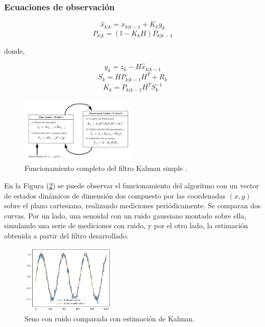 \subsubsection{Ecuaciones de observación}

\begin{equation}
\hat{x}_{k|k} = \hat{x}_{k|k-1} + K_k y_k
\end{equation}
\begin{equation}
P_{k|k} = (\mathbb{I}-K_kH)P_{k|k-1}
\end{equation}

donde,

\begin{equation}
y_k = z_k - H\hat{x}_{k|k-1}
\end{equation}
\begin{equation}
S_k = HP_{k|k-1}H^T + R_k
\end{equation}
\begin{equation}
K_k = P_{k|k-1}H^TS_k^{-1}
\end{equation}

\begin{figure}[H]
		\centering
		\includegraphics[width=0.5\textwidth]{Imagenes/kalman1.png}
		\caption{Funcionamiento completo del filtro Kalman simple \cite{ref:kalman2}.}
		\label{fig:kalman1}
\end{figure}



 En la Figura (\ref{fig:kalman-comp}) se puede observar el funcionamiento del algoritmo con un vector de estados dinámicos de dimensión dos compuesto por las coordenadas $(x,y)$ sobre el plano cartesiano, realizando mediciones periódicamente. Se comparan dos curvas. Por un lado, una senoidal con un ruido gaussiano montado sobre ella, simulando una serie de mediciones con ruido, y por el otro lado, la estimación obtenida a partir del filtro desarrollado.

\begin{figure}[H]
\centering
	\includegraphics[width=0.4\textwidth]{Imagenes/Kalman_test_1.png}
	\caption{Seno con ruido comparada con estimación de Kalman.}
	\label{fig:kalman-comp}
\end{figure}



